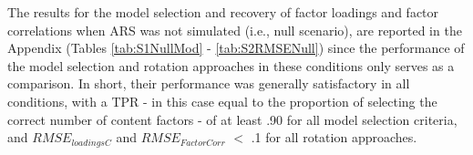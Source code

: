 \documentclass[a4paper,man,natbib]{apa6}
\begin{document}
\begin{linenumbers}

The results for the model selection and recovery of factor loadings and factor correlations when ARS was not simulated (i.e., null scenario), are reported in the Appendix (Tables \ref{tab:S1NullMod} - \ref{tab:S2RMSENull}) since the performance of the model selection and rotation approaches in these conditions only serves as a comparison. In short, their performance was generally satisfactory in all conditions, with a TPR - in this case equal to the proportion of selecting the correct number of content factors - of at least .90 for all model selection criteria, and $RMSE_{loadingsC}$ and $RMSE_{FactorCorr}$ $<$ .1 for all rotation approaches. 



\end{linenumbers}
\end{document}

